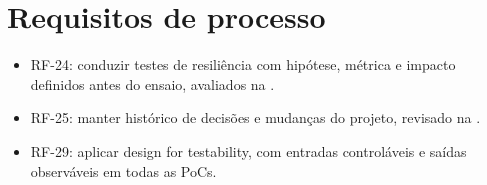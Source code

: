 \section{Requisitos de processo}
\begingroup\small
\begin{itemize}
\item RF-24: conduzir testes de resiliência com hipótese, métrica e impacto definidos antes do ensaio, avaliados na .
\item RF-25: manter histórico de decisões e mudanças do projeto, revisado na .
\item RF-29: aplicar design for testability, com entradas controláveis e saídas observáveis em todas as PoCs.
\end{itemize}
\endgroup
